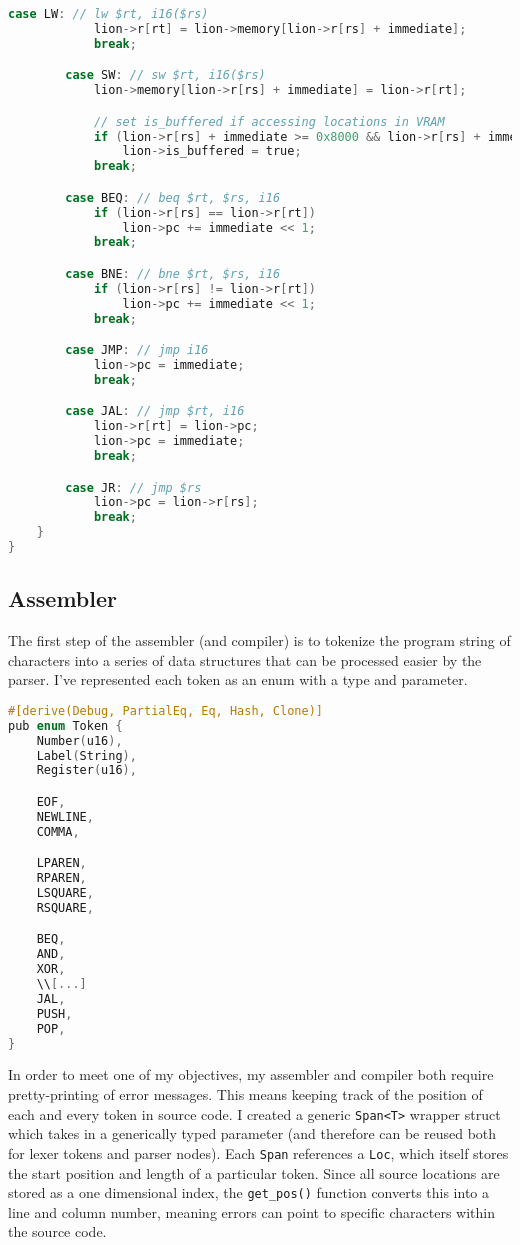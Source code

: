 \begin{lstlisting}[language=C]
        case LW: // lw $rt, i16($rs)
            lion->r[rt] = lion->memory[lion->r[rs] + immediate];
            break;

        case SW: // sw $rt, i16($rs)
            lion->memory[lion->r[rs] + immediate] = lion->r[rt];

            // set is_buffered if accessing locations in VRAM
            if (lion->r[rs] + immediate >= 0x8000 && lion->r[rs] + immediate <= 0x8800)
                lion->is_buffered = true;
            break;

        case BEQ: // beq $rt, $rs, i16
            if (lion->r[rs] == lion->r[rt])
                lion->pc += immediate << 1;
            break;

        case BNE: // bne $rt, $rs, i16
            if (lion->r[rs] != lion->r[rt])
                lion->pc += immediate << 1;
            break;

        case JMP: // jmp i16
            lion->pc = immediate;
            break;

        case JAL: // jmp $rt, i16
            lion->r[rt] = lion->pc;
            lion->pc = immediate;
            break;

        case JR: // jmp $rs
            lion->pc = lion->r[rs];
            break;
    }
}
\end{lstlisting}

\subsection{Assembler}
The first step of the assembler (and compiler) is to tokenize the program string of characters into a series of data structures that can be processed easier by the parser. I've represented each token as an enum with a type and parameter. 

\begin{lstlisting}[language=C]
#[derive(Debug, PartialEq, Eq, Hash, Clone)]
pub enum Token {
    Number(u16),
    Label(String),
    Register(u16),

    EOF,
    NEWLINE,
    COMMA,

    LPAREN,
    RPAREN,
    LSQUARE,
    RSQUARE,

    BEQ,
    AND,
    XOR,
    \\[...]
    JAL,
    PUSH,
    POP,
}
\end{lstlisting}

In order to meet one of my objectives, my assembler and compiler both require pretty-printing of error messages. This means keeping track of the position of each and every token in source code. I created a generic \texttt{Span<T>} wrapper struct which takes in a generically typed parameter (and therefore can be reused both for lexer tokens and parser nodes). Each \texttt{Span} references a \texttt{Loc}, which itself stores the start position and length of a particular token. Since all source locations are stored as a one dimensional index, the \texttt{get\_pos()} function converts this into a line and column number, meaning errors can point to specific characters within the source code.

